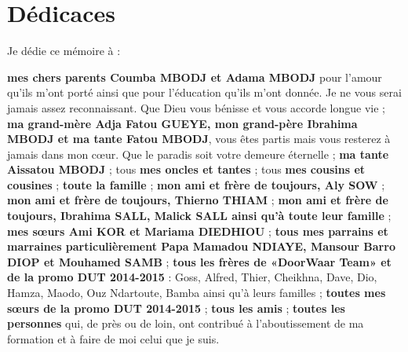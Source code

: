 %
%

\chapter*{Dédicaces}

Je dédie ce mémoire à : \\
\begin{itemize}
	\itemcheck \textbf{mes chers parents Coumba MBODJ et Adama MBODJ} pour l’amour qu’ils m’ont porté ainsi que pour l’éducation qu’ils m’ont donnée. Je ne vous serai jamais assez reconnaissant. Que Dieu vous bénisse et vous accorde longue vie ;
	\itemcheck  \textbf{ma grand-mère Adja Fatou GUEYE, mon grand-père Ibrahima MBODJ et ma tante Fatou MBODJ}, vous êtes partis mais vous resterez à jamais dans mon cœur. Que le paradis soit votre demeure éternelle ;
	\itemcheck \textbf{ma tante Aissatou MBODJ} ;
	\itemcheck tous \textbf{mes oncles et tantes} ;
	\itemcheck tous \textbf{mes cousins et cousines} ;
	\itemcheck \textbf{toute la famille} ;
	\itemcheck \textbf{mon ami et frère de toujours, Aly SOW} ;
	\itemcheck \textbf{mon ami et frère de toujours, Thierno THIAM} ;
	\itemcheck \textbf{mon ami et frère de toujours, Ibrahima SALL, Malick SALL ainsi qu'à toute leur famille} ;
	\itemcheck \textbf{ mes sœurs Ami KOR et Mariama DIEDHIOU} ;
	\itemcheck \textbf{tous mes parrains et marraines particulièrement Papa Mamadou NDIAYE, Mansour Barro DIOP et Mouhamed SAMB} ;
	\itemcheck \textbf{tous les frères de «DoorWaar Team» et de la promo DUT 2014-2015} : Goss, Alfred, Thier, Cheikhna, Dave, Dio, Hamza, Maodo, Ouz Ndartoute, Bamba ainsi qu'à leurs familles ;
	\itemcheck \textbf{toutes mes sœurs de la promo DUT 2014-2015} ;
	\itemcheck \textbf{tous les amis} ;
	\itemcheck \textbf{toutes les personnes} qui, de près ou de loin, ont contribué à l’aboutissement de ma formation et à faire de moi celui que je suis.
\end{itemize}
\clearpage